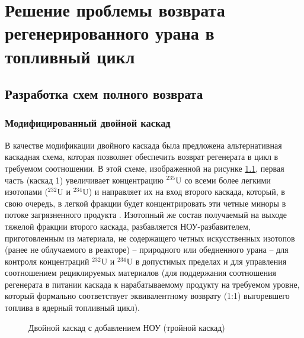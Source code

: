 \chapter{Решение проблемы возврата регенерированного урана в топливный цикл}

\section{Разработка схем полного возврата}\label{sec:ch2/sec3}
\subsection{Модифицированный двойной каскад}

В качестве модификации двойного каскада была предложена альтернативная каскадная схема, которая позволяет обеспечить возврат регенерата в цикл в требуемом соотношении. В этой схеме, изображенной 
на рисунке \ref{fig:vestnik}, первая часть (каскад 1) увеличивает 
концентрацию $^{235}$U со всеми более легкими изотопами ($^{232}$U и $^{234}$U) и направляет их на вход второго каскада, который, в свою очередь, в легкой фракции будет концентрировать эти четные миноры в потоке загрязненного продукта \cite{smirnovObogashchenieRegenerirovannogoUrana2018}.
Изотопный же состав получаемый на выходе тяжелой фракции второго каскада, разбавляется НОУ-разбавителем, приготовленным из материала, не содержащего четных искусственных изотопов (ранее не облучаемого в реакторе) -- природного или обедненного урана -- для контроля концентраций $^{232}$U и $^{234}$U в допустимых пределах и для управления соотношением рециклируемых материалов (для поддержания соотношения регенерата в питании каскада к нарабатываемому продукту на требуемом уровне, который формально соответствует эквивалентному возврату (1:1) выгоревшего топлива в ядерный топливный цикл).

\begin{figure}[ht]
  \caption{Двойной каскад с добавлением НОУ (тройной каскад)}\label{fig:vestnik}
\end{figure}

